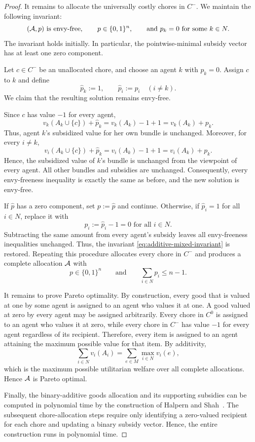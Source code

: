 \begin{proof}
It remains to allocate the universally costly chores in $C^-$. We maintain the
following invariant:
\begin{equation}\label{eq:additive-mixed-invariant}
  (\mathcal{A},p)\text{ is envy-free},\qquad
  p\in\{0,1\}^n,
  \qquad
  \text{and }p_k=0\text{ for some }k\in N.
\end{equation}
The invariant holds initially. In particular, the pointwise-minimal subsidy
vector has at least one zero component.

Let $c\in C^-$ be an unallocated chore, and choose an agent $k$ with $p_k=0$.
Assign $c$ to $k$ and define
\[
  \widehat p_k:=1,
  \qquad
  \widehat p_i:=p_i\quad(i\neq k).
\]
We claim that the resulting solution remains envy-free.

Since $c$ has value $-1$ for every agent,
\[
  v_k(A_k\cup\{c\})+\widehat p_k
  =
  v_k(A_k)-1+1
  =
  v_k(A_k)+p_k.
\]
Thus, agent $k$'s subsidized value for her own bundle is unchanged. Moreover,
for every $i\neq k$,
\[
  v_i(A_k\cup\{c\})+\widehat p_k
  =
  v_i(A_k)-1+1
  =
  v_i(A_k)+p_k.
\]
Hence, the subsidized value of $k$'s bundle is unchanged from the viewpoint of
every agent. All other bundles and subsidies are unchanged. Consequently, every
envy-freeness inequality is exactly the same as before, and the new solution is
envy-free.

If $\widehat p$ has a zero component, set $p:=\widehat p$ and continue.
Otherwise, if $\widehat p_i=1$ for all $i\in N$, replace it with
\[
  p_i:=\widehat p_i-1=0 \text{ for all } i\in N.
\]
Subtracting the same amount from every agent's subsidy leaves all envy-freeness
inequalities unchanged. Thus, the invariant \eqref{eq:additive-mixed-invariant}
is restored. Repeating this procedure allocates every chore in $C^-$ and
produces a complete allocation $\mathcal{A}$ with
\[
  p\in\{0,1\}^n
  \qquad\text{and}\qquad
  \sum_{i\in N}p_i\leq n-1.
\]

It remains to prove Pareto optimality. By construction, every good that is
valued at one by some agent is assigned to an agent who values it at one. A good
valued at zero by every agent may be assigned arbitrarily. Every chore in $C^0$
is assigned to an agent who values it at zero, while every chore in $C^-$ has
value $-1$ for every agent regardless of its recipient. Therefore, every item is
assigned to an agent attaining the maximum possible value for that item. By
additivity,
\[
  \sum_{i\in N}v_i(A_i)
  =
  \sum_{e\in M}\max_{i\in N}v_i(e),
\]
which is the maximum possible utilitarian welfare over all complete allocations.
Hence $\mathcal{A}$ is Pareto optimal.

Finally, the binary-additive goods allocation and its supporting subsidies can
be computed in polynomial time by the construction of Halpern and
Shah~\cite{HS19}. The subsequent chore-allocation steps require only identifying
a zero-valued recipient for each chore and updating a binary subsidy vector.
Hence, the entire construction runs in polynomial time.
\end{proof}

